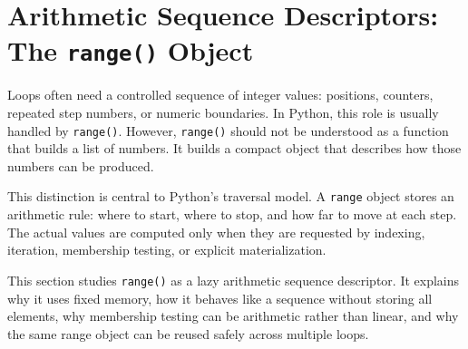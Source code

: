 \section{Arithmetic Sequence Descriptors: The \texttt{range()} Object}

Loops often need a controlled sequence of integer values: positions, counters, repeated step numbers, or numeric boundaries. In Python, this role is usually handled by \texttt{range()}. However, \texttt{range()} should not be understood as a function that builds a list of numbers. It builds a compact object that describes how those numbers can be produced.

This distinction is central to Python's traversal model. A \texttt{range} object stores an arithmetic rule: where to start, where to stop, and how far to move at each step. The actual values are computed only when they are requested by indexing, iteration, membership testing, or explicit materialization.

This section studies \texttt{range()} as a lazy arithmetic sequence descriptor. It explains why it uses fixed memory, how it behaves like a sequence without storing all elements, why membership testing can be arithmetic rather than linear, and why the same range object can be reused safely across multiple loops.